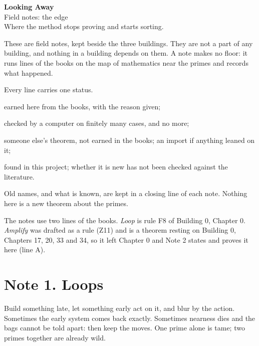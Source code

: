 

\sloppy
\begin{center}
{\Large\bfseries Looking Away}\\[4pt]
{\large Field notes: the edge}\\[4pt]
{\small Where the method stops proving and starts sorting.}
\end{center}
\renewcommand{\contentsname}{Contents}
\tableofcontents
\bigskip

These are field notes, kept beside the three buildings. They are not a part of any building, and nothing in a building depends on them. A note makes no floor: it runs lines of the books on the map of mathematics near the primes and records what happened.

Every line carries one status.
\begin{lines}
\item[\lab{[proved]}] earned here from the books, with the reason given;
\item[\lab{[machine]}] checked by a computer on finitely many cases, and no more;
\item[\lab{[reported]}] someone else's theorem, not earned in the books; an import if anything leaned on it;
\item[\lab{[unchecked]}] found in this project; whether it is new has not been checked against the literature.
\end{lines}
Old names, and what is known, are kept in a closing line of each note. Nothing here is a new theorem about the primes.

The notes use two lines of the books. \emph{Loop} is rule F8 of Building 0, Chapter 0. \emph{Amplify} was drafted as a rule (Z11) and is a theorem resting on Building 0, Chapters 17, 20, 33 and 34, so it left Chapter 0 and Note 2 states and proves it here (line A).

\newpage
\section*{Note 1. Loops}
\begin{center}
{\small Build something late, let something early act on it, and blur by the action. Sometimes the early system comes back exactly. Sometimes nearness dies and the bags cannot be told apart: then keep the moves. One prime alone is tame; two primes together are already wild.}
\end{center}


